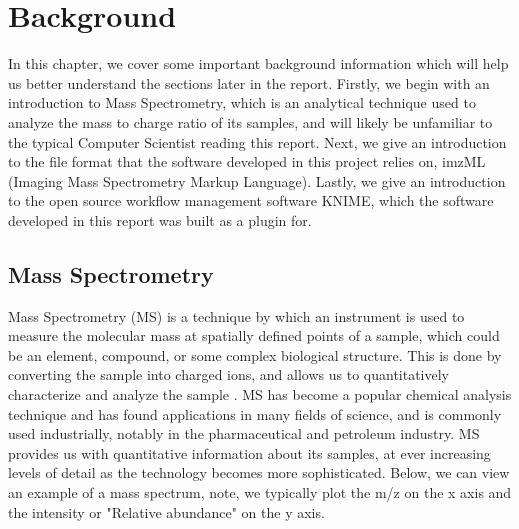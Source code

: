 \documentclass[11pt,openany]{book}
\begin{document}
\chapter{Background}
\label{chapter:Background}
In this chapter, we cover some important background information which will help us better understand the sections later in the report. Firstly, we begin with an introduction to Mass Spectrometry, which is an analytical technique used to analyze the mass to charge ratio of its samples, and will likely be unfamiliar to the typical Computer Scientist reading this report. Next, we give an introduction to the file format that the software developed in this project relies on, imzML (Imaging Mass Spectrometry Markup Language). Lastly, we give an introduction to the open source workflow management software KNIME, which the software developed in this report was built as a plugin for. 

\section{Mass Spectrometry}
Mass Spectrometry (MS) is a technique by which an instrument is used to measure the molecular mass at spatially defined points of a sample, which could be an element, compound, or some complex biological structure. This is done by converting the sample into charged ions, and allows us to quantitatively characterize and analyze the sample \cite{fund_contemp_MS_book}. MS has become a popular chemical analysis technique and has found applications in many fields of science, and is commonly used industrially, notably in the pharmaceutical and petroleum industry. MS provides us with quantitative information about its samples, at ever increasing levels of detail as the technology becomes more sophisticated. Below, we can view an example of a mass spectrum, note, we typically plot the m/z on the x axis and the intensity or "Relative abundance" on the y axis.
\end{document}
